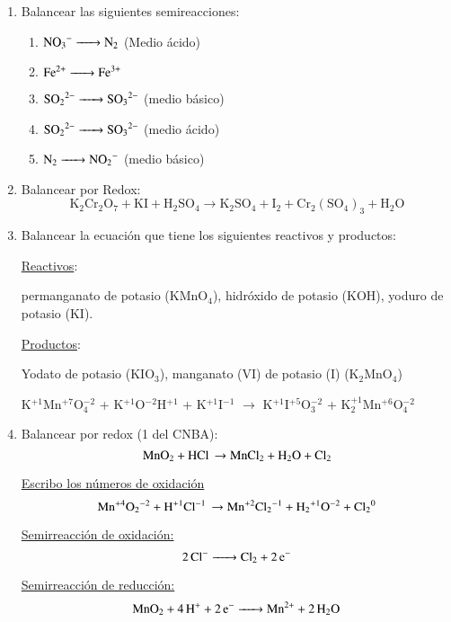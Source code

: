 \begin{enumerate}

\item Balancear las siguientes semireacciones:
\begin{enumerate}
    \item $\ce{ NO_3^- -> N_2 }$ (Medio ácido)
    \item $\ce{ Fe^{2+} -> Fe^{3+} }$
    \item $\ce{ SO_2^{\;2-} -> SO_3^{\;2-} }$ (medio básico)
    \item $\ce{ SO_2^{\;2-} -> SO_3^{\;2-} }$ (medio ácido)
    \item $\ce{ N_2 -> NO_2^- }$ (medio básico)
\end{enumerate}


\item Balancear por Redox:
$$\text{K}_2\text{Cr}_2\text{O}_7 + \text{KI} + \text{H}_2\text{SO}_4 \longrightarrow \text{K}_2\text{SO}_4 + \text{I}_2 + \text{Cr}_2(\text{SO}_4)_3 + \text{H}_2\text{O}$$


\item Balancear la ecuación que tiene los siguientes reactivos y productos:

\underline{Reactivos}:

permanganato de potasio (KMnO$_4$), hidróxido de potasio (KOH), yoduro de potasio (KI).

\skipline
\underline{Productos}:

Yodato de potasio (KIO$_3$), manganato (VI) de potasio (I) (K$_2$MnO$_4$)

\skipline
{\large
\hfil
K$^{+1}$Mn$^{+7}$O$_4^{-2}$ \hfil+\hfil
K$^{+1}$O$^{-2}$H$^{+1}$ \hfil+\hfil
K$^{+1}$I$^{-1}$ \hfil$\longrightarrow$\hfil
K$^{+1}$I$^{+5}$O$_3^{-2}$ \hfil+\hfil
K$_2^{+1}$Mn$^{+6}$O$_4^{-2}$
\hfil
}


\newpage
\item Balancear por redox (1 del CNBA):
$$\ce{MnO_2 + HCl \rightarrow MnCl_2 + H_2O + Cl_2}$$

\underline{Escribo los números de oxidación}
$$\ce{Mn^{+4}O_2^{-2} + H^{+1}Cl^{-1} \rightarrow Mn^{+2}Cl_2^{-1} + H_2^{+1}O^{-2} + Cl_2^{0}}$$

\begin{multicols}{2}
    \underline{Semirreacción de oxidación:}
    $$\ce{2Cl^- ->
    Cl_2 + 2e^-}$$
    
    \underline{Semirreacción de reducción:}
    $$\ce{MnO_2 + 4 H^+ + 2e^- ->
    Mn^{2+} + 2H_2O}$$
\end{multicols}


\end{enumerate}

